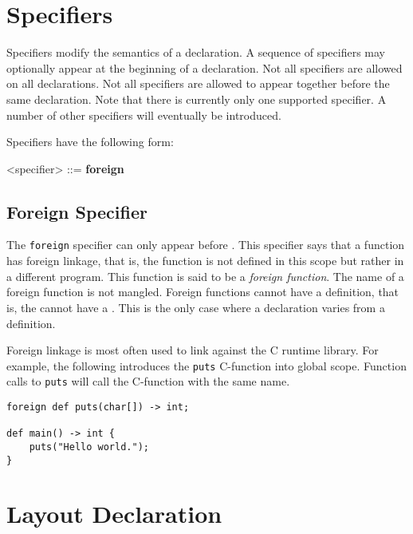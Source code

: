 \section{Specifiers} \label{spec_guide}

Specifiers modify the semantics of a declaration. A sequence of specifiers may optionally appear at the beginning of a declaration. Not all specifiers are allowed on all declarations. Not all specifiers are allowed to appear together before the same declaration. Note that there is currently only one supported specifier. A number of other specifiers will eventually be introduced.

Specifiers have the following form:

\begin{grammar}
\singlespace
<specifier> ::= \textbf{foreign}
\end{grammar}

\subsection{Foreign Specifier} \label{foreign_spec}

The \texttt{foreign} specifier can only appear before . This specifier says that a function has foreign linkage, that is, the function is not defined in this scope but rather in a different program. This function is said to be a \textit{foreign function}. The name of a foreign function is not mangled. Foreign functions cannot have a definition, that is, the  cannot have a . This is the only case where a declaration varies from a definition.

Foreign linkage is most often used to link against the C runtime library. For example, the following introduces the \texttt{puts} C-function into global scope. Function calls to \texttt{puts} will call the C-function with the same name.

\noindent\begin{minipage}{\linewidth}
\begin{lstlisting}
foreign def puts(char[]) -> int;

def main() -> int {
	puts("Hello world.");
}
\end{lstlisting}
\end{minipage}
 
\section{Layout Declaration} \label{layout_guide}

